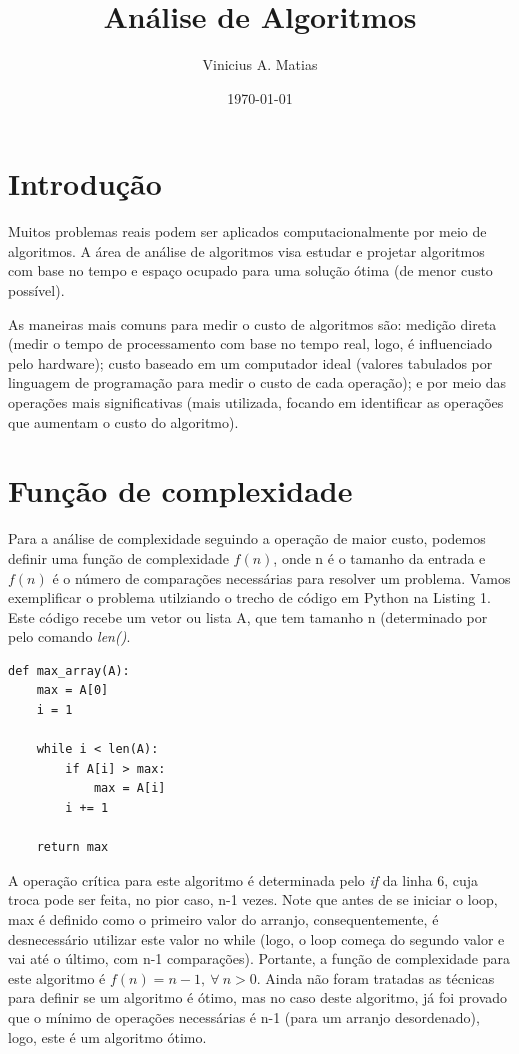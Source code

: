 \documentclass[ a4paper, twocolumn]{article}
\title{Análise de Algoritmos}
\author{Vinicius A. Matias}
\date{\today}
\theoremstyle{definition}
\begin{document}
\maketitle

\section{Introdução}
Muitos problemas reais podem ser aplicados computacionalmente por meio de algoritmos. A área de análise de algoritmos visa estudar e projetar algoritmos com base no tempo e espaço ocupado para uma solução ótima (de menor custo possível). 

As maneiras mais comuns para medir o custo de algoritmos são: medição direta (medir o tempo de processamento com base no tempo real, logo, é influenciado pelo hardware); custo baseado em um computador ideal (valores tabulados  por linguagem de programação para medir o custo de cada operação); e por meio das operações mais significativas (mais utilizada, focando em identificar as operações que aumentam o custo do algoritmo).

\section{Função de complexidade}

Para a análise de complexidade seguindo a operação de maior custo, podemos definir uma função de complexidade $f(n)$, onde n é o tamanho da entrada e $f(n)$ é o número de comparações necessárias para resolver um problema. Vamos exemplificar o problema utilziando o trecho de código em Python na Listing 1. Este código recebe um vetor ou lista A, que tem tamanho n (determinado por pelo comando \textit{len()}.

\begin{lstlisting}[label=max_array,caption= Maior valor de um arranjo]
def max_array(A):
    max = A[0]
    i = 1
    
    while i < len(A):
        if A[i] > max:
            max = A[i]  
        i += 1
    
    return max
\end{lstlisting}

A operação crítica para este algoritmo é determinada pelo \textit{if} da linha 6, cuja troca pode ser feita, no pior caso, n-1 vezes. Note que antes de se iniciar o loop, max é definido como o primeiro valor do arranjo, consequentemente, é desnecessário utilizar este valor no while (logo, o loop começa do segundo valor e vai até o último, com n-1 comparações). Portante, a função de complexidade para este algoritmo é $f(n) = n - 1, \ \forall \ n>0$. Ainda não foram tratadas as técnicas para definir se um algoritmo é ótimo, mas no caso deste algoritmo, já foi provado que o mínimo de operações necessárias é n-1 (para um arranjo desordenado), logo, este é um algoritmo ótimo.
\end{document}
